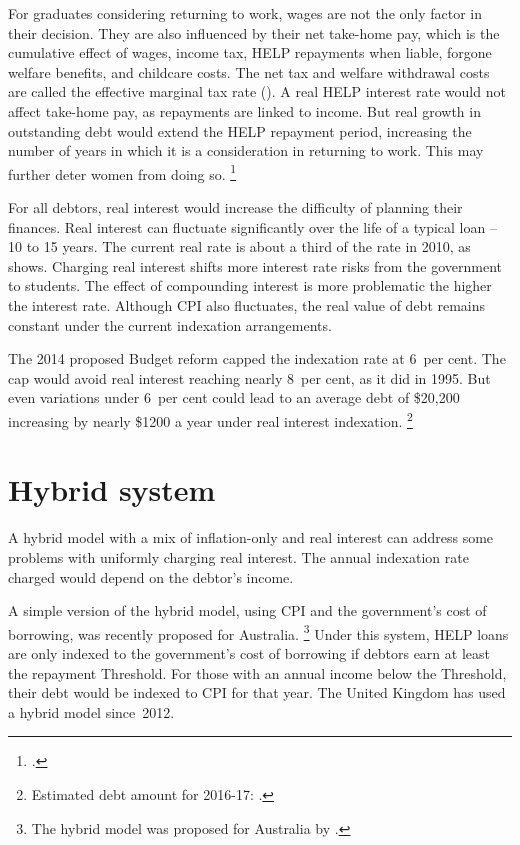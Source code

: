 \documentclass[embargoed]{grattan}
\begin{document}
For graduates considering returning to work, wages are not the only factor in their decision.
They are also influenced by their net take-home pay, which is the cumulative effect of wages, income tax, \gls{HELP} repayments when liable, forgone welfare benefits, and childcare costs.
The net tax and welfare withdrawal costs are called the effective marginal tax rate ().
A real \gls{HELP} interest rate would not affect take-home pay, as repayments are linked to income.
But real growth in outstanding debt would extend the \gls{HELP} repayment period, increasing the number of years in which it is a consideration in returning to work.
This may further deter women from doing so.%
\footcites[][Section~4.2.1]{Daley2012Gamechangerseconomic}{Commission2014Childcareearlychildhood}


For all debtors, real interest would increase the difficulty of planning their finances.
Real interest can fluctuate significantly over the life of a typical loan -- 10 to 15 years.
The current real rate is about a third of the rate in 2010, as  shows.
Charging real interest shifts more interest rate risks from the government to students.
The effect of compounding interest is more problematic the higher the interest rate.
Although \gls{CPI} also fluctuates, the real value of debt remains constant under the current indexation arrangements.

The 2014 proposed Budget reform capped the indexation rate at 6~per cent.
The cap would avoid real interest reaching nearly 8~per cent, as it did in 1995.
But even variations under 6~per cent could lead to an average debt of \$20,200 increasing by nearly \$1200 a year under real interest indexation.%
\footnote{Estimated debt amount for 2016-17: \textcite[][59]{Education2016Portfoliobudgetstatements}.}

\section{Hybrid system}\label{sec:hybrid-system}

A hybrid model with a mix of inflation-only and real interest can address some problems with uniformly charging real interest.
The annual indexation rate charged would depend on the debtor's income.

A simple version of the hybrid model, using \gls{CPI} and the government's cost of borrowing, was recently proposed for Australia.%
\footnote{The hybrid model was proposed for Australia by \textcite{Chapman2014HELPinterestrate}.} Under this system, \gls{HELP} loans are only indexed to the government's cost of borrowing if debtors earn at least the repayment \gls{Threshold}.
For those with an annual income below the \gls{Threshold}, their debt would be indexed to \gls{CPI} for that year.
The United Kingdom has used a hybrid model since~2012.
\end{document}
